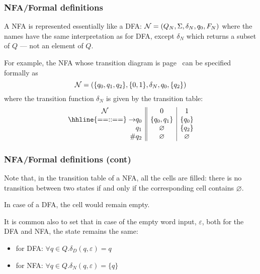 % 
\begin{frame}
\frametitle{NFA/Formal definitions}

\label{nfa_01_suffix_table}

A NFA is represented essentially like a DFA:
\(
{\cal N} = (Q_N, \Sigma, \delta_N, q_0, F_N)
\)
where the names have the same interpretation as for DFA, except
\(\delta_N\) which returns a subset of \(Q\) --- not an element of
\(Q\).

\bigskip

For example, the NFA whose transition diagram is
page~\pageref{nfa_01_suffix} can be specified formally as
\[
{\cal N} = (\{q_0, q_1, q_2\}, \{0, 1\}, \delta_N, q_0, \{q_2\})
\]
where the transition function \(\delta_N\) is given by the transition
table:
\[
\begin{array}{r@{}l||c|c}
\multicolumn{2}{c||}{\cal N} & 0 & 1\\
\hhline{==::==}
\rightarrow & q_0 & \{q_0, q_1\} & \{q_0\}\\
            & q_1 & \varnothing  & \{q_2\}\\
\#          & q_2 & \varnothing  & \varnothing
\end{array}
\]

\end{frame}

% 
\begin{frame}
\frametitle{NFA/Formal definitions (cont)}

Note that, in the transition table of a NFA, all the cells are
filled: there is no transition between two states if and only if the
corresponding cell contains \(\varnothing\). 

\bigskip

In case of a DFA, the cell would remain empty.

\bigskip

It is common also to set that in case of the empty word input,
\(\varepsilon\), both for the DFA and NFA, the state remains the
same:
\begin{itemize}

  \item for DFA: \(\forall q \in Q.\delta_D (q, \varepsilon) = q\)

  \item for NFA: \(\forall q \in Q.\delta_N (q, \varepsilon) = \{q\}\)

\end{itemize}

\end{frame}

